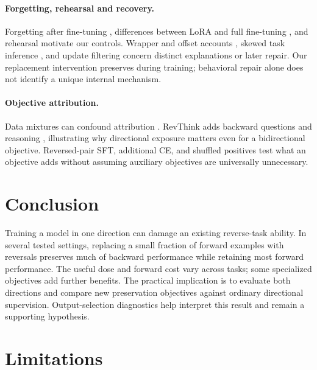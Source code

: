\documentclass[11pt]{article}
\begin{document}
\paragraph{Forgetting, rehearsal and recovery.}
Forgetting after fine-tuning \citep{luo2023forgetting}, differences between LoRA and full
fine-tuning \citep{biderman2024lora}, and rehearsal \citep{scialom2022rehearsal} motivate
our controls. Wrapper and offset accounts \citep{jain2024wrapper,lee2024dpo}, skewed task
inference \citep{kotha2024forgetting}, and update filtering
\citep{spectral2026unforgetting} concern distinct explanations or later repair. Our
replacement intervention preserves during training; behavioral repair alone does not
identify a unique internal mechanism.

\paragraph{Objective attribution.}
Data mixtures can confound attribution \citep{longpre2023flan,lipton2018troubling}.
RevThink adds backward questions and reasoning \citep{chen2025revthink}, illustrating
why directional exposure matters even for a bidirectional objective. Reversed-pair SFT,
additional CE, and shuffled positives test what an objective adds without assuming
auxiliary objectives are universally unnecessary.

\section{Conclusion}
Training a model in one direction can damage an existing reverse-task ability. In several
tested settings, replacing a small fraction of forward examples with reversals preserves
much of backward performance while retaining most forward performance. The useful dose
and forward cost vary across tasks; some specialized objectives add further benefits.
The practical implication is to evaluate both directions and compare new preservation
objectives against ordinary directional supervision. Output-selection diagnostics help
interpret this result and remain a supporting hypothesis.

\section*{Limitations}
\label{sec:limitations}
\end{document}
